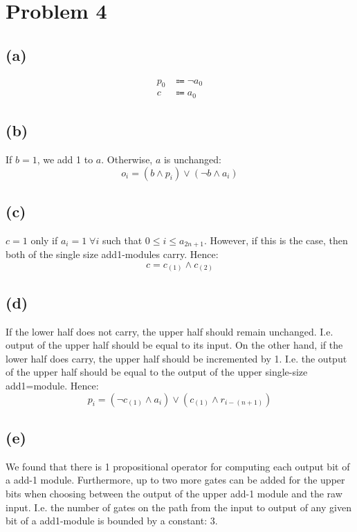 \documentclass{article}
\begin{document}
\pagebreak

\section{Problem 4}
\subsection{(a)}
\begin{align*}
	p_0 & \Coloneqq \neg a_0 \\
	c   & \Coloneqq a_0
\end{align*}

\subsection{(b)}
If $b = 1$, we add 1 to $a$. Otherwise, $a$ is unchanged:
\[
	o_i = (b \land p_i) \lor (\neg b \land a_i)
\]

\subsection{(c)}
$c = 1$ only if $a_i = 1 \; \forall i$ such that $0 \le i \le a_{2n + 1}$. However, if this is the case, then both of the single size add1-modules carry. Hence:
\[
	c = c_{(1)} \land c_{(2)}
\]

\subsection{(d)}
If the lower half does not carry, the upper half should remain unchanged. I.e. output of the upper half should be equal to its input. On the other hand, if the lower half does carry, the upper half should be incremented by 1. I.e. the output of the upper half should be equal to the output of the upper single-size add1=module. Hence:
\[
	p_i = (\neg c_{(1)} \land a_i) \lor (c_{(1)} \land r_{i-(n+1)})
\]

\subsection{(e)}
We found that there is 1 propositional operator for computing each output bit of a add-1 module. Furthermore, up to two more gates can be added for the upper bits when choosing between the output of the upper add-1 module and the raw input.  I.e. the number of gates on the path from the input to output of any given bit of a add1-module is bounded by a constant: $3$.
\end{document}
